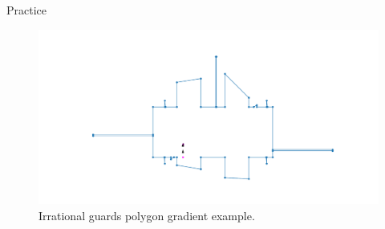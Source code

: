 \documentclass{beamer}
\begin{document}
\begin{frame}{Practice}
	\begin{figure}
		\centering
		\includegraphics[width = \textwidth]{Images/love_gradient.png}
		\caption{Irrational guards polygon \cite{abrahamsen2021art} gradient example.}
	\end{figure}
\end{frame}
\end{document}
